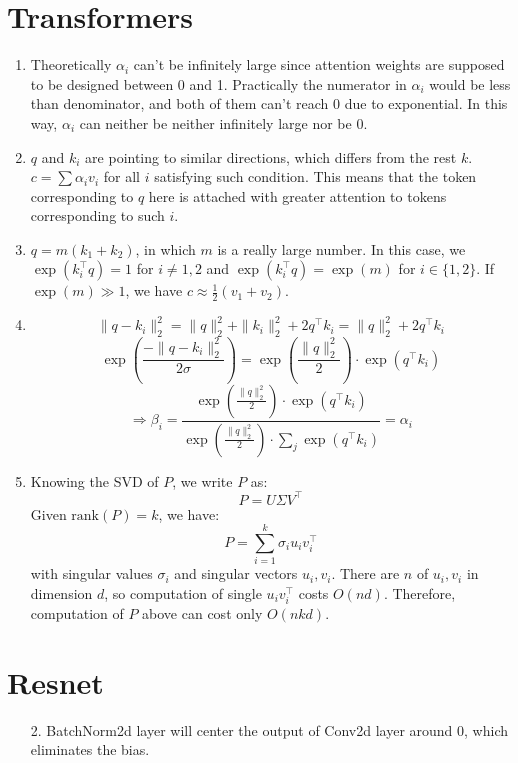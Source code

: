 \documentclass[12pt]{article}
\begin{document}
\section{Transformers}
\begin{enumerate}
    \item Theoretically $\alpha_i$ can't be infinitely large since attention weights are supposed to be designed between 0 and 1. Practically the numerator in $\alpha_i$ would be less than denominator, and both of them can't reach 0 due to exponential. In this way, $\alpha_i$ can neither be neither infinitely large nor be 0.
    \item $q$ and $k_i$ are pointing to similar directions, which differs from the rest $k$. $c = \sum \alpha_i v_i$ for all $i$ satisfying such condition. This means that the token corresponding to $q$ here is attached with greater attention to tokens corresponding to such $i$.
    \item $q = m(k_1 + k_2)$, in which $m$ is a really large number. In this case, we $\exp(k_i^{\top}q) = 1$ for $i\neq 1, 2$ and $\exp(k_i^{\top}q) = \exp(m)$ for $i \in \{1, 2\}$. If $\exp(m) \gg 1$, we have $c \approx \frac{1}{2}(v_1 + v_2)$.
    \item \[\|q - k_i\|_2^2 = \|q\|^2_2 + \|k_i\|^2_2 + 2q^{\top}k_i = \|q\|^2_2 + 2q^{\top}k_i\]
    \[\exp(\frac{-\|q - k_i\|^2_2}{2\sigma}) = \exp(\frac{\|q\|^2_2}{2})\cdot\exp(q^{\top}k_i)\]
    \[\Longrightarrow \beta_i = \frac{\exp(\frac{\|q\|^2_2}{2})\cdot\exp(q^{\top}k_i)}{\exp(\frac{\|q\|^2_2}{2})\cdot\sum_j\exp(q^{\top}k_i)} = \alpha_i\]
    \item Knowing the SVD of $P$, we write $P$ as:
    \[P = U\Sigma V^{\top}\]
    Given $\text{rank}(P) = k$, we have:
    \[P = \sum_{i=1}^k\sigma_i u_i v_i^{\top}\]
    with singular values $\sigma_i$ and singular vectors $u_i, v_i$. There are $n$ of $u_i, v_i$ in dimension $d$, so computation of single $u_i v_i^{\top}$ costs $O(nd)$. Therefore, computation of $P$ above can cost only $O(nkd)$.
\end{enumerate}

\section{Resnet}
\begin{enumerate}
    \item[2.] BatchNorm2d layer will center the output of Conv2d layer around 0, which eliminates the bias.
\end{enumerate}
\newpage
\end{document}
